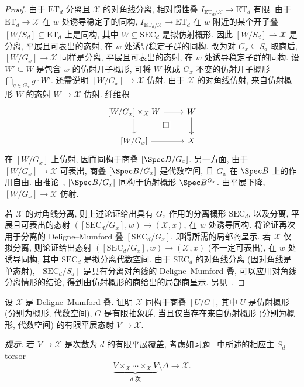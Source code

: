 \begin{proof}
由于 $\mathrm{ET}_d$ 分离且 $\mathcal X$ 的对角线分离, 相对惯性叠 $I_{\mathrm{ET}_d/\mathcal X}\to\mathrm{ET}_d$ 有限. 由于 $\mathrm{ET}_d\to\mathcal X$ 在 $w$ 处诱导稳定子的同构, $I_{\mathrm{ET}_d/\mathcal X}\to\mathrm{ET}_d$ 在 $w$ 附近的某个开子叠 $[W/S_d]\subseteq\mathrm{ET}_d$ 上是同构, 其中 $W\subseteq\mathrm{SEC}_d$ 是拟仿射概形. 因此 $[W/S_d]\to\mathcal X$ 是分离, 平展且可表出的态射, 在 $w$ 处诱导稳定子群的同构. 改为对 $G_x\subseteq S_d$ 取商后, $[W/G_x]\to\mathcal X$ 同样是分离, 平展且可表出的态射, 在 $w$ 处诱导稳定子群的同构. 设 $W'\subseteq W$ 是包含 $w$ 的仿射开子概形, 可将 $W$ 换成 $G_x$-不变的仿射开子概形 $\bigcap_{g\in G_x}g\cdot W'$. 还需说明 $[W/G_x]\to\mathcal X$ 仿射. 由于 $\mathcal X$ 的对角线仿射, 来自仿射概形 $W$ 的态射 $W\to\mathcal X$ 仿射. 纤维积
\[
\begin{tikzcd}
{[W/G_x]}\times_{\mathcal X}W\arrow[r]\arrow[d]&W\arrow[d]\\
{[W/G_x]}\arrow[r]\arrow[ur,phantom,"\square" description]&\mathcal X
\end{tikzcd}
\]
在 $[W/G_x]$ 上仿射, 因而同构于商叠 $[\Spec B/G_x]$. 另一方面, 由于 $[W/G_x]\to\mathcal X$ 可表出, 商叠 $[\Spec B/G_x]$ 是代数空间, 且 $G_x$ 在 $\Spec B$ 上的作用自由. 由推论~, $[\Spec B/G_x]$ 同构于仿射概形 $\Spec B^{G_x}$. 由平展下降, $[W/G_x]\to\mathcal X$ 仿射.

若 $\mathcal X$ 的对角线分离, 则上述论证给出具有 $G_x$ 作用的分离概形 $\mathrm{SEC}_d$, 以及分离, 平展且可表出的态射 $([\mathrm{SEC}_d/G_x],w)\to(\mathcal X,x)$, 在 $w$ 处诱导同构. 将论证再次用于分离的 Deligne--Mumford 叠 $[\mathrm{SEC}_d/G_x]$, 即得所需的局部商呈示. 若 $\mathcal X$ 仅拟分离, 则论证给出态射 $([\mathrm{SEC}_d/G_x],w)\to(\mathcal X,x)$ (不一定可表出), 在 $w$ 处诱导同构, 其中 $\mathrm{SEC}_d$ 是拟分离代数空间. 由于 $\mathrm{SEC}_d$ 的对角线分离 (因对角线是单态射), $[\mathrm{SEC}_d/S_d]$ 是具有分离对角线的 Deligne--Mumford 叠, 可以应用对角线分离情形的结论, 得到由仿射概形的商给出的局部商呈示. 另见~\cite[定理 $6.2$]{LMB00}.
\end{proof}
\begin{exercise}\label{src:5.3.2}
设 $\mathcal X$ 是 Deligne--Mumford 叠. 证明 $\mathcal X$ 同构于商叠 $[U/G]$, 其中 $U$ 是仿射概形 (分别为概形, 代数空间), $G$ 是有限抽象群, 当且仅当存在来自仿射概形 (分别为概形, 代数空间) 的有限平展态射 $V\to\mathcal X$.

\textit{提示:} 若 $V\to\mathcal X$ 是次数为 $d$ 的有限平展覆盖, 考虑如习题~ 中所述的相应主 $S_d$-torsor
\[
\underbrace{V\times_{\mathcal X}\cdots\times_{\mathcal X}V}_{d\text{ 次}}\setminus\Delta\longrightarrow\mathcal X.
\]
\end{exercise}

